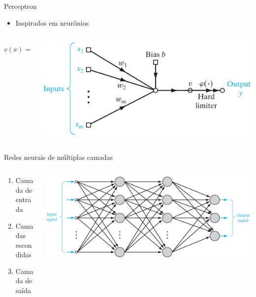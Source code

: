 \documentclass[compress,aspectratio=149,brazil]{beamer}
\begin{document}
\begin{frame}{Perceptron}
    \begin{itemize}
        \item Inspirados em neurônios
    \end{itemize}
    \begin{columns}
        \begin{column}{.5\textwidth}
            \[
                v(x) = \sum_{i=1}^{m}{w_i  x_i + b}
            \]
        \end{column}
        \begin{column}{.5\textwidth}
            \includegraphics[width=\textwidth]{../images/perceptron.png}
        \end{column}
    \end{columns}
\end{frame}

\begin{frame}{Redes neurais de múltiplas camadas}
    \begin{columns}
        \begin{column}{.4\textwidth}
            \begin{enumerate}
                \item Camada de entrada
                \item Camadas escondidas
                \item Camada de saída
            \end{enumerate}
        \end{column}
        \begin{column}{.6\textwidth}
            \includegraphics[width=\textwidth]{../images/neuralNetwork.png}
        \end{column}
    \end{columns}
\end{frame}
\end{document}
